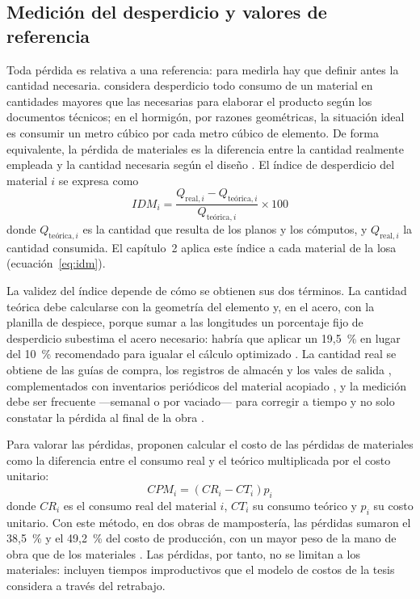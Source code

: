 \subsection{Medición del desperdicio y valores de referencia}

Toda pérdida es relativa a una referencia: para medirla hay que definir antes la cantidad necesaria. \textcite[p.~9]{galarza2011} considera desperdicio todo consumo de un material en cantidades mayores que las necesarias para elaborar el producto según los documentos técnicos; en el hormigón, por razones geométricas, la situación ideal es consumir un metro cúbico por cada metro cúbico de elemento. De forma equivalente, la pérdida de materiales es la diferencia entre la cantidad realmente empleada y la cantidad necesaria según el diseño \parencite[sección~2]{rossi2001}. El índice de desperdicio del material $i$ se expresa como
\begin{equation}
  IDM_i = \frac{Q_{\text{real},i} - Q_{\text{teórica},i}}{Q_{\text{teórica},i}} \times 100
  \label{eq:idm-marco}
\end{equation}
donde $Q_{\text{teórica},i}$ es la cantidad que resulta de los planos y los cómputos, y $Q_{\text{real},i}$ la cantidad consumida. El capítulo~2 aplica este índice a cada material de la losa (ecuación~\ref{eq:idm}).

La validez del índice depende de cómo se obtienen sus dos términos. La cantidad teórica debe calcularse con la geometría del elemento y, en el acero, con la planilla de despiece, porque sumar a las longitudes un porcentaje fijo de desperdicio subestima el acero necesario: habría que aplicar un 19,5~\% en lugar del 10~\% recomendado para igualar el cálculo optimizado \parencite[pp.~589--590]{abbott2008}. La cantidad real se obtiene de las guías de compra, los registros de almacén y los vales de salida \parencite[pp.~53, 64]{galarza2011}, complementados con inventarios periódicos del material acopiado \parencite[p.~331]{formoso1999}, y la medición debe ser frecuente ---semanal o por vaciado--- para corregir a tiempo y no solo constatar la pérdida al final de la obra \parencite[p.~334]{formoso1999}.

Para valorar las pérdidas, \textcite[sección~4.5]{rossi2001} proponen calcular el costo de las pérdidas de materiales como la diferencia entre el consumo real y el teórico multiplicada por el costo unitario:
\begin{equation}
  CPM_i = \left(CR_i - CT_i\right) p_i
  \label{eq:cpm}
\end{equation}
donde $CR_i$ es el consumo real del material $i$, $CT_i$ su consumo teórico y $p_i$ su costo unitario. Con este método, en dos obras de mampostería, las pérdidas sumaron el 38,5~\% y el 49,2~\% del costo de producción, con un mayor peso de la mano de obra que de los materiales \parencite[secciones~5.1 y 5.2]{rossi2001}. Las pérdidas, por tanto, no se limitan a los materiales: incluyen tiempos improductivos que el modelo de costos de la tesis considera a través del retrabajo.


